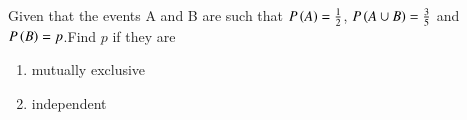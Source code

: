 \begin{flushleft}
Given that the events A and B are such that $P\left(A\right)=\frac{1}{2}$, $P\left(A \cup B\right)=\frac{3}{5}$ and $P\left(B\right)=p$.Find $p$ if they are
\begin{enumerate}
\item mutually exclusive
\item independent
\end{enumerate}
\end{flushleft}